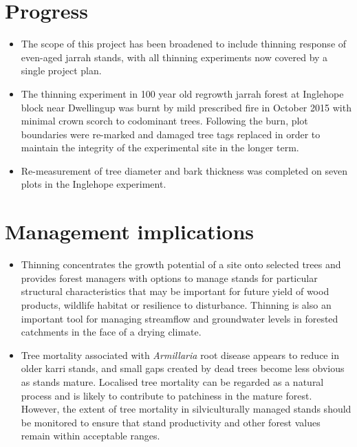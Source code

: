 \documentclass[version=last,
    paper=a4, %
    10pt, %
    usenames,
    dvipsnames,
    oneside, %
    headings=openany, %
    DIV=15 %
]{scrbook}
\begin{document}
\section*{Progress}
\begin{itemize}
\itemsep1pt\parskip0pt
\item
  The scope of this project has been broadened to include thinning
  response of even-aged jarrah stands, with all thinning experiments now
  covered by a single project plan.
\item
  The thinning experiment in 100 year old regrowth jarrah forest at
  Inglehope block near Dwellingup was burnt by mild prescribed fire in
  October 2015 with minimal crown scorch to codominant trees. Following
  the burn, plot boundaries were re-marked and damaged tree tags
  replaced in order to maintain the integrity of the experimental site
  in the longer term.
\item
  Re-measurement of tree diameter and bark thickness was completed on
  seven plots in the Inglehope experiment.
\end{itemize}



\section*{Management implications}
\begin{itemize}
\itemsep1pt\parskip0pt
\item
  Thinning concentrates the growth potential of a site onto selected
  trees and provides forest managers with options to manage stands for
  particular structural characteristics that may be important for future
  yield of wood products, wildlife habitat or resilience to disturbance.
  Thinning is also an important tool for managing streamflow and
  groundwater levels in forested catchments in the face of a drying
  climate.
\item
  Tree mortality associated with \emph{Armillaria} root disease appears
  to reduce in older karri stands, and small gaps created by dead trees
  become less obvious as stands mature. Localised tree mortality can be
  regarded as a natural process and is likely to contribute to
  patchiness in the mature forest. However, the extent of tree mortality
  in silviculturally managed stands should be monitored to ensure that
  stand productivity and other forest values remain within acceptable
  ranges.
\end{itemize}
\end{document}

